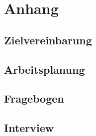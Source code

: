 \part{Anhang}
\begin{appendix}

  
  
  
  \chapter{Zielvereinbarung}
  
  \chapter{Arbeitsplanung}
  
  \chapter{Fragebogen}
  
  \chapter{Interview}
  
  

\end{appendix}